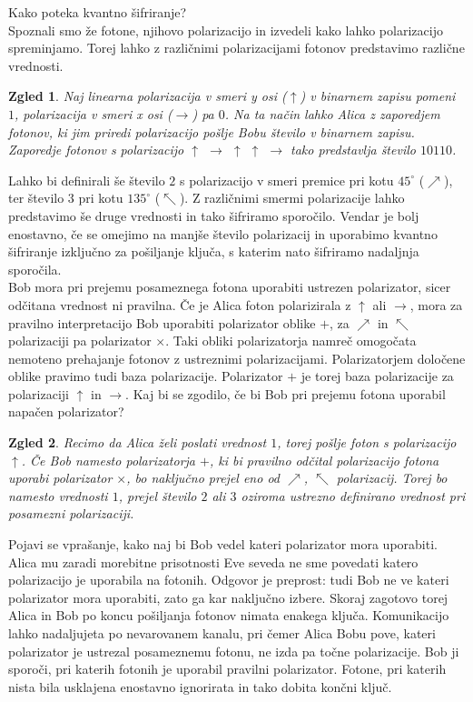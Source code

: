 \documentclass[A4paper, 11pt]{article}
\newtheorem{zgled}{Zgled}
\begin{document}
Kako poteka kvantno šifriranje?\\
Spoznali smo že fotone, njihovo polarizacijo in izvedeli kako lahko polarizacijo spreminjamo. Torej lahko z različnimi polarizacijami fotonov predstavimo različne vrednosti.

\begin{zgled}
Naj linearna polarizacija v smeri y osi ($\uparrow$) v binarnem zapisu pomeni $1$, polarizacija v smeri x osi ($\rightarrow$) pa $0$. Na ta način lahko Alica z zaporedjem fotonov, ki jim priredi polarizacijo pošlje Bobu število v binarnem zapisu. Zaporedje fotonov s polarizacijo $\uparrow$ $\rightarrow$ $\uparrow$ $\uparrow$ $\rightarrow$ tako predstavlja število $1 0 1 1 0$.
\end{zgled}

Lahko bi definirali še število $2$ s polarizacijo v smeri premice pri kotu $45^{\circ}$ ($\nearrow$), ter število $3$ pri kotu $135^{\circ}$ ($\nwarrow$). Z različnimi smermi polarizacije lahko predstavimo še druge vrednosti in tako šifriramo sporočilo. Vendar je bolj enostavno, če se omejimo na manjše število polarizacij in uporabimo kvantno šifriranje izključno za pošiljanje ključa, s katerim nato šifriramo nadaljnja sporočila. \\

Bob mora pri prejemu posameznega fotona uporabiti ustrezen polarizator, sicer odčitana vrednost ni pravilna. Če je Alica foton polarizirala z $\uparrow$ ali $\rightarrow$, mora za pravilno interpretacijo Bob uporabiti polarizator oblike $+$, za $\nearrow$ in $\nwarrow$ polarizaciji pa polarizator $\times$. Taki obliki polarizatorja namreč omogočata nemoteno prehajanje fotonov z ustreznimi polarizacijami. Polarizatorjem določene oblike pravimo tudi baza polarizacije. Polarizator $+$ je torej baza polarizacije za polarizaciji $\uparrow$ in $\rightarrow$. Kaj bi se zgodilo, če bi Bob pri prejemu fotona uporabil napačen polarizator?

\begin{zgled}
Recimo da Alica želi poslati vrednost $1$, torej pošlje foton s polarizacijo $\uparrow$. Če Bob namesto polarizatorja $+$, ki bi pravilno odčital polarizacijo fotona uporabi polarizator $\times$, bo naključno prejel eno od $\nearrow$, $\nwarrow$ polarizacij. Torej bo namesto vrednosti $1$, prejel število $2$ ali $3$ oziroma ustrezno definirano vrednost pri posamezni polarizaciji.
\end{zgled}

Pojavi se vprašanje, kako naj bi Bob vedel kateri polarizator mora uporabiti. Alica mu zaradi morebitne prisotnosti Eve seveda ne sme povedati katero polarizacijo je uporabila na fotonih. Odgovor je preprost: tudi Bob ne ve kateri polarizator mora uporabiti, zato ga kar naključno izbere. Skoraj zagotovo torej Alica in Bob po koncu pošiljanja fotonov nimata enakega ključa. Komunikacijo lahko nadaljujeta po nevarovanem kanalu, pri čemer Alica Bobu pove, kateri polarizator je ustrezal posameznemu fotonu, ne izda pa točne polarizacije. Bob ji sporoči, pri katerih fotonih je uporabil pravilni polarizator. Fotone, pri katerih nista bila usklajena enostavno ignorirata in tako dobita končni ključ. \\
\end{document}
